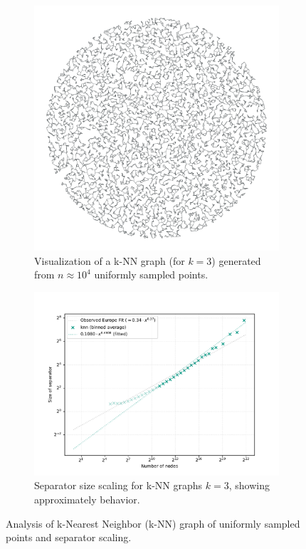 \begin{figure}[tbhp]
    \centering
    \begin{subfigure}{0.35\linewidth}
        \centering
        \includegraphics[width=\linewidth]{graphics/knn.png}
        \caption{Visualization of a k-NN graph (for \(k=3\)) generated from \(n \approx 10^4\) uniformly sampled points.}
        \label{fig:knn_graph_structure_viz}
    \end{subfigure}
    \hfill
    \begin{subfigure}{0.55\linewidth}
        \centering
        \includegraphics[width=\linewidth]{graphics/knn_seps.pdf}
        \caption{Separator size scaling for k-NN graphs \(k=3\), showing approximately  behavior.}
        \label{fig:knn_graph_sep_scaling_plot}
    \end{subfigure}
    \caption{Analysis of k-Nearest Neighbor (k-NN) graph of uniformly sampled points and separator scaling.}
    \label{fig:knn_graph_analysis}
\end{figure}

